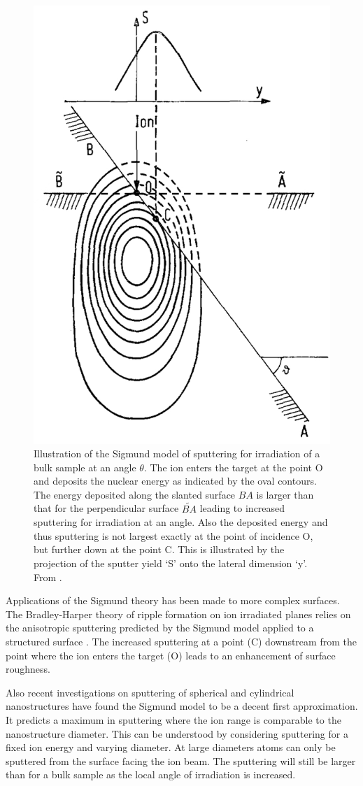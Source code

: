 \begin{figure}
	\centering
		\includegraphics[width=.35\textwidth]{images/anglesigmund.jpg}
	\caption{Illustration of the Sigmund model of sputtering for irradiation of a bulk sample at an angle $\theta$. The ion enters the target at the point O and deposits the nuclear energy as indicated by the oval contours. The energy deposited along the slanted surface $BA$ is larger than that for the perpendicular surface $\widetilde{BA}$ leading to increased sputtering for irradiation at an angle. Also the deposited energy and thus sputtering is not largest exactly at the point of incidence O, but further down at the point C. This is illustrated by the projection of the sputter yield `S' onto the lateral dimension `y'.  From \cite{sigmund_mechanism_1973}.}
	\label{anglesigmund}
\end{figure} 

Applications of the Sigmund theory has been made to more complex surfaces. The Bradley-Harper theory of ripple formation on ion irradiated planes relies on the anisotropic sputtering predicted by the Sigmund model applied to a structured surface \cite{sigmund_mechanism_1973,bradley_theory_1988}. The increased sputtering at a point (C) downstream from the point where the ion enters the target (O) leads to an enhancement of surface roughness.

Also recent investigations on sputtering of spherical \cite{nietiadi_sputtering_2014} and cylindrical \cite{urbassek_sputter_2015} nanostructures have found the Sigmund model to be a decent first approximation. It predicts a maximum in sputtering where the ion range is comparable to the nanostructure diameter. This can be understood by considering sputtering for a fixed ion energy and varying diameter. At large diameters atoms can only be sputtered from the surface facing the ion beam. The sputtering will still be larger than for a bulk sample as the local angle of irradiation is increased. 

